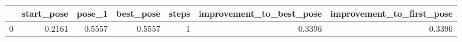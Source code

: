 \begin{tabular}{lrrrrrr}
\toprule
{} &  start\_pose &  pose\_1 &  best\_pose &  steps &  improvement\_to\_best\_pose &  improvement\_to\_first\_pose \\
\midrule
0 &      0.2161 &  0.5557 &     0.5557 &      1 &                    0.3396 &                     0.3396 \\
\bottomrule
\end{tabular}
